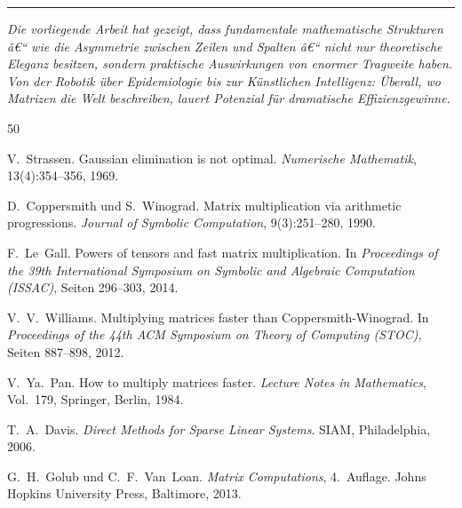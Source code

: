 ﻿\documentclass[a4paper,12pt]{report}
\theoremstyle{definition}
\begin{document}
	\vspace{1cm}
	
	\begin{center}
		\rule{0.5\textwidth}{0.4pt}
	\end{center}
	
	\vspace{0.5cm}
	
	\textit{Die vorliegende Arbeit hat gezeigt, dass fundamentale mathematische Strukturen â€“ wie die Asymmetrie zwischen Zeilen und Spalten â€“ nicht nur theoretische Eleganz besitzen, sondern praktische Auswirkungen von enormer Tragweite haben. Von der Robotik über Epidemiologie bis zur Künstlichen Intelligenz: Überall, wo Matrizen die Welt beschreiben, lauert Potenzial für dramatische Effizienzgewinne.}

\begin{thebibliography}{50}

V.~Strassen.
\newblock Gaussian elimination is not optimal.
\newblock \textit{Numerische Mathematik}, 13(4):354--356, 1969.

D.~Coppersmith und S.~Winograd.
\newblock Matrix multiplication via arithmetic progressions.
\newblock \textit{Journal of Symbolic Computation}, 9(3):251--280, 1990.

F.~Le~Gall.
\newblock Powers of tensors and fast matrix multiplication.
\newblock In \textit{Proceedings of the 39th International Symposium on Symbolic and Algebraic Computation (ISSAC)}, Seiten 296--303, 2014.

V.~V.~Williams.
\newblock Multiplying matrices faster than Coppersmith-Winograd.
\newblock In \textit{Proceedings of the 44th ACM Symposium on Theory of Computing (STOC)}, Seiten 887--898, 2012.

V.~Ya.~Pan.
\newblock How to multiply matrices faster.
\newblock \textit{Lecture Notes in Mathematics}, Vol.~179, Springer, Berlin, 1984.

T.~A.~Davis.
\newblock \textit{Direct Methods for Sparse Linear Systems}.
\newblock SIAM, Philadelphia, 2006.

G.~H.~Golub und C.~F.~Van~Loan.
\newblock \textit{Matrix Computations}, 4.~Auflage.
\newblock Johns Hopkins University Press, Baltimore, 2013.


\end{thebibliography}
\end{document}
